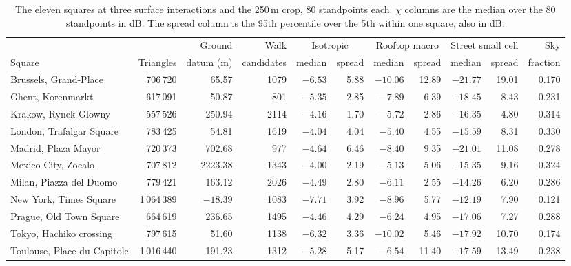 \documentclass[journal]{IEEEtran}
\begin{document}
\begin{table}[t]
  \centering
  \caption{The eleven squares at three surface interactions and the 250\,m
  crop, 80 standpoints each. $\chi$ columns are the median over the 80
  standpoints in dB. The spread column is the 95th percentile over the 5th
  within one square, also in dB.}
  \label{tab:si-sites}
  \footnotesize
  \begin{tabular}{lrrrrrrrrrr}
    \toprule
    & & Ground & Walk & \multicolumn{2}{c}{Isotropic} & \multicolumn{2}{c}{Rooftop macro} & \multicolumn{2}{c}{Street small cell} & Sky \\
    \cmidrule(lr){5-6}\cmidrule(lr){7-8}\cmidrule(lr){9-10}
    Square & Triangles & datum (m) & candidates & median & spread & median & spread & median & spread & fraction \\
    \midrule
    Brussels, Grand-Place       & 706\,720   & 65.57   & 1079 & $-6.53$ & 5.88 & $-10.06$ & 12.89 & $-21.77$ & 19.01 & 0.170 \\
    Ghent, Korenmarkt           & 617\,091   & 50.87   & 801  & $-5.35$ & 2.85 & $-7.89$  & 6.39  & $-18.45$ & 8.43  & 0.231 \\
    Krakow, Rynek Glowny        & 557\,526   & 250.94  & 2114 & $-4.16$ & 1.70 & $-5.72$  & 2.86  & $-16.35$ & 4.80  & 0.314 \\
    London, Trafalgar Square    & 783\,425   & 54.81   & 1619 & $-4.04$ & 4.04 & $-5.40$  & 4.55  & $-15.59$ & 8.31  & 0.330 \\
    Madrid, Plaza Mayor         & 720\,373   & 702.68  & 977  & $-4.64$ & 6.46 & $-8.40$  & 9.35  & $-21.01$ & 11.08 & 0.278 \\
    Mexico City, Zocalo         & 707\,812   & 2223.38 & 1343 & $-4.00$ & 2.19 & $-5.13$  & 5.06  & $-15.35$ & 9.16  & 0.324 \\
    Milan, Piazza del Duomo     & 779\,421   & 163.12  & 2026 & $-4.49$ & 2.80 & $-6.11$  & 2.55  & $-14.26$ & 6.20  & 0.286 \\
    New York, Times Square      & 1\,064\,389 & $-18.39$ & 1083 & $-7.71$ & 3.92 & $-8.96$  & 5.77  & $-12.19$ & 7.90  & 0.121 \\
    Prague, Old Town Square     & 664\,619   & 236.65  & 1495 & $-4.46$ & 4.29 & $-6.24$  & 4.95  & $-17.06$ & 7.27  & 0.288 \\
    Tokyo, Hachiko crossing     & 797\,615   & 51.60   & 1138 & $-6.32$ & 3.36 & $-10.02$ & 5.46  & $-17.92$ & 10.70 & 0.174 \\
    Toulouse, Place du Capitole & 1\,016\,440 & 191.23  & 1312 & $-5.28$ & 5.17 & $-6.54$  & 11.40 & $-17.59$ & 13.49 & 0.238 \\
    \bottomrule
  \end{tabular}
\end{table}
\end{document}
